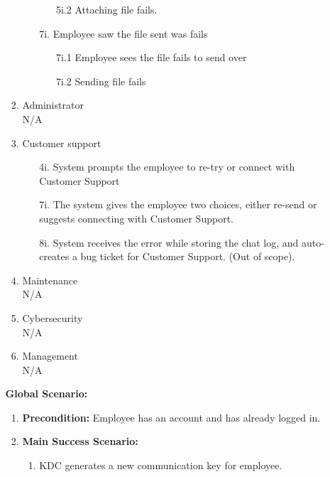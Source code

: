 \documentclass[]{article}
\begin{document}
\begin{enumerate}[{\bf BE1.}]
\begin{enumerate}[{\bf BE7.}]
\begin{enumerate}[{\bf VP1.}]
\begin{enumerate}
\begin{enumerate}
                        \item[5i.2] Attaching file fails.
                    \end{enumerate}
                    \item[7i.] Employee saw the file sent was fails
                    \begin{enumerate}
                        \item[7i.1] Employee sees the file fails to send over
                        \item[7i.2] Sending file fails
                    \end{enumerate}
                \end{enumerate}
		  \item Administrator \\
				N/A
            \item Customer support \\
            \begin{enumerate}
                \item[4i.] System prompts the employee to re-try or connect with Customer Support 
                \item[7i.] The system gives the employee two choices, either re-send or suggests connecting with Customer Support. 
                \item[8i.] System receives the error while storing the chat log, and auto-creates a bug ticket for Customer Support. (Out of scope). 
            \end{enumerate}
            \item Maintenance \\
            N/A
            \item Cybersecurity \\
            N/A
            \item Management \\
            N/A \\
		\end{enumerate}
		{\bf Global Scenario:}\\
        \begin{enumerate}[{  }]
            \item \textbf{Precondition:} Employee has an account and has already logged in.
            \item \textbf{Main Success Scenario:}
            \begin{enumerate}[{  1.}]
                    \item KDC generates a new communication key for employee.

\end{enumerate}
\end{enumerate}
\end{enumerate}
\end{enumerate}
\end{document}

